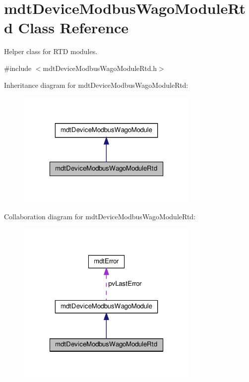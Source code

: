 \hypertarget{classmdt_device_modbus_wago_module_rtd}{\section{mdt\-Device\-Modbus\-Wago\-Module\-Rtd Class Reference}
\label{classmdt_device_modbus_wago_module_rtd}
}


Helper class for R\-T\-D modules.  




{\ttfamily \#include $<$mdt\-Device\-Modbus\-Wago\-Module\-Rtd.\-h$>$}



Inheritance diagram for mdt\-Device\-Modbus\-Wago\-Module\-Rtd\-:\nopagebreak
\begin{figure}[H]
\begin{center}
\leavevmode
\includegraphics[width=250pt]{classmdt_device_modbus_wago_module_rtd__inherit__graph}
\end{center}
\end{figure}


Collaboration diagram for mdt\-Device\-Modbus\-Wago\-Module\-Rtd\-:
\nopagebreak
\begin{figure}[H]
\begin{center}
\leavevmode
\includegraphics[width=250pt]{classmdt_device_modbus_wago_module_rtd__coll__graph}
\end{center}
\end{figure}
